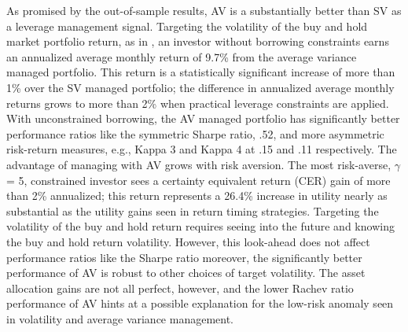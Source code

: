 As promised by the out-of-sample results, AV is a substantially better than SV as a leverage management signal. Targeting the volatility of the buy and hold market portfolio return, as in \citet{moreira_volatility-managed_2017}, an investor without borrowing constraints earns an annualized average monthly return of 9.7\% from the average variance managed portfolio. This return is a statistically significant increase of more than 1\% over the SV managed portfolio; the difference in annualized average monthly returns grows to more than 2\% when practical leverage constraints are applied. With unconstrained borrowing, the AV managed portfolio has significantly better performance ratios like the symmetric Sharpe ratio, .52, and more asymmetric risk-return measures, e.g., Kappa 3 and Kappa 4 at .15 and .11 respectively. The advantage of managing with AV grows with risk aversion. The most risk-averse, $\gamma$ = 5, constrained investor sees a certainty equivalent return (CER) gain of more than 2\% annualized; this return represents a 26.4\% increase in utility nearly as substantial as the utility gains seen in return timing strategies. \citep{campbell1997econometrics} Targeting the volatility of the buy and hold return requires seeing into the future and knowing the buy and hold return volatility. However, this look-ahead does not affect performance ratios like the Sharpe ratio moreover, the significantly better performance of AV is robust to other choices of target volatility. The asset allocation gains are not all perfect, however, and the lower Rachev ratio performance of AV hints at a possible explanation for the low-risk anomaly seen in volatility and average variance management. 

